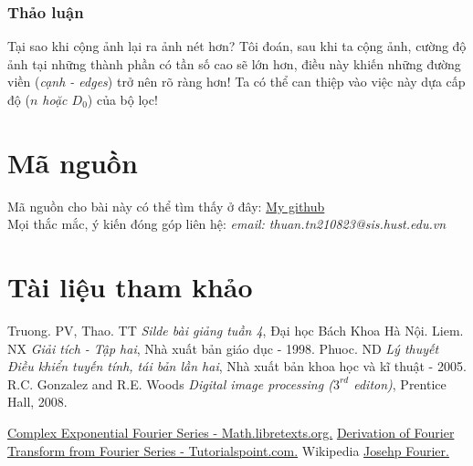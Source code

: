 \documentclass{article}
\begin{document}
        \subsubsection{Thảo luận}
        Tại sao khi cộng ảnh lại ra ảnh nét hơn? Tôi đoán, sau khi ta cộng ảnh, cường độ ảnh tại những thành phần có tần số cao sẽ lớn hơn, điều này khiến những đường viền (\textit{cạnh - edges}) trở nên rõ ràng hơn! Ta có thể can thiệp vào việc này dựa cấp độ (\textit{$n$ hoặc $D_0$}) của bộ lọc!
        
        \newpage
        \phantom{a}
        \newpage
        \section{Mã nguồn}
        Mã nguồn cho bài này có thể tìm thấy ở đây:
        \href{https://github.com/thuantn210823/Computer-Vision-IPSAL-LAB-}{My github}\\ Mọi thắc mắc, ý kiến đóng góp liên hệ: \emph{email: thuan.tn210823@sis.hust.edu.vn}
        \section{Tài liệu tham khảo}
        \begin{thebibliography}{9}
    Truong. PV, Thao. TT \emph{Silde bài giảng tuần 4}, Đại học Bách Khoa Hà Nội.
        Liem. NX \emph{Giải tích - Tập hai}, Nhà xuất bản giáo dục - 1998.
        Phuoc. ND \emph{Lý thuyết Điều khiển tuyến tính, tái bản lần hai}, Nhà xuất bản khoa học và kĩ thuật - 2005.
    R.C. Gonzalez and R.E. Woods \emph{Digital image processing ($3^{rd}$ editon)}, Prentice Hall, 2008.

    \href{https://math.libretexts.org/Bookshelves/Differential_Equations/Introduction_to_Partial_Differential_Equations_(Herman)/09%3A_Transform_Techniques_in_Physics/9.02%3A_Complex_Exponential_Fourier_Series}{Complex Exponential Fourier Series - Math.libretexts.org.}
    \href{https://www.tutorialspoint.com/derivation-of-fourier-transform-from-fourier-series}{Derivation of Fourier Transform from Fourier Series - Tutorialspoint.com.}
    Wikipedia \href{https://vi.wikipedia.org/wiki/Joseph_Fourier}{Josehp Fourier.}
    \end{thebibliography}
\end{document}
